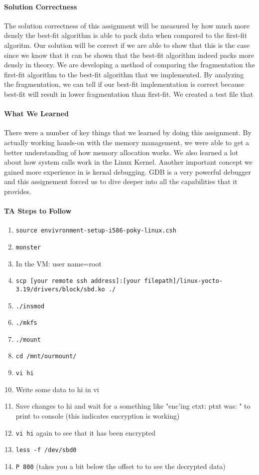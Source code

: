 \documentclass[titlepage,draftclsnofoot,onecolumn]{article}
\begin{document}
\paragraph{Solution Correctness}
The solution correctness of this assignment will be measured by how much more densly the best-fit algorithm is able to pack data when compared to the first-fit algoritm. Our solution will be correct if we are able to show that this is the case since we know that it can be shown that the best-fit algorithm indeed packs more densly in theory. We are developing a method of comparing the fragmentation the first-fit algorithm to the best-fit algorithm that we implemented. By analyzing the fragmentation, we can tell if our best-fit implementation is correct because best-fit will result in lower fragmentation than first-fit. We created a test file that

\paragraph{What We Learned}
There were a number of key things that we learned by doing this assignment. By actually working hands-on with the memory management, we were able to get a better understanding of how memory allocation works. We also learned a lot about how system calls work in the Linux Kernel. Another important concept we gained more experience in is kernal debugging. GDB is a very powerful debugger and this assignement forced us to dive deeper into all the capabilities that it provides.

\paragraph{TA Steps to Follow}


\begin{enumerate}
	\item \texttt{source envivronment-setup-i586-poky-linux.csh}
	\item \texttt{monster}
	\item In the VM: user name=root
	\item \texttt{scp [your remote ssh address]:[your filepath]/linux-yocto-3.19/drivers/block/sbd.ko ./}
	\item \texttt{./insmod}
	\item \texttt{./mkfs}
	\item \texttt{./mount}
	\item \texttt{cd /mnt/ourmount/}
	\item \texttt{vi hi}
	\item Write some data to hi in vi
	\item Save changes to hi and wait for a something like "enc'ing ctxt: ptxt was: " to print to console (this indicates encryption is working)
	\item \texttt{vi hi} again to see that it has been encrypted
	\item \texttt{less -f /dev/sbd0}
	\item \texttt{P 800} (takes you a bit below the offset to to see the decrypted data)
  \end{enumerate}
  
\end{document}
